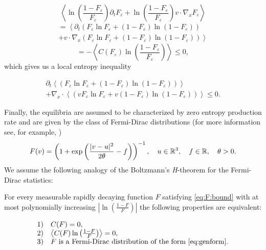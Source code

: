 \[ \left\langle\ln\left(\frac{1-F_\varepsilon }{F_\varepsilon}\right)\partial_t F_\varepsilon  +\ln\left(\frac{1-F_\varepsilon }{F_\varepsilon}\right)v\cdot \nabla_xF_\varepsilon\right\rangle   
\]
  \begin{multline*}=
	\left\langle\partial_t (F_\varepsilon \ln F_\varepsilon+(1-F_\varepsilon )\ln(1-F_\varepsilon ))  \right.\\+ \left.v\cdot \nabla_x(F_\varepsilon \ln F_\varepsilon+(1-F_\varepsilon )\ln(1-F_\varepsilon ))\right\rangle
\end{multline*}     
\[=-\left\langle
C(F_\varepsilon )\ln\left(\frac{1-F_\varepsilon }{F_\varepsilon}\right)\right\rangle \le0,\]which gives us a local entropy inequality

 \begin{multline*}
	\partial_t \left\langle(F_\varepsilon \ln F_\varepsilon+(1-F_\varepsilon )\ln(1-F_\varepsilon )) \right\rangle \\+ \nabla_x\cdot\left\langle(v F_\varepsilon \ln F_\varepsilon+v (1-F_\varepsilon )\ln(1-F_\varepsilon ))\right\rangle\le 0.
\end{multline*} 



Finally, the equilibria are assumed to be characterized by zero entropy
production rate and are given by the class of Fermi-Dirac distributions (for more information see, for example, \cite{Landau1968Course})
\begin{equation}\label{eq:genform}
F(v) =\left(1+ \exp\left(\frac{|v-u|^2}{2\theta}-f\right)\right)^{-1},\quad u\in {\mathbb {R}^3},\quad f\in\mathbb R,\quad \theta>0.
\end{equation}
We assume the following analogy of the Boltzmann's \textit{H}-theorem for the Fermi-Dirac statistics:
\begin{theorem}
	For every measurable rapidly decaying function $F$ satisfying \eqref{eq:F:bound} with at most polynomially increasing $|\ln \left(\frac{1-F}{F}\right)|$  the following properties 
are equivalent:
 
\begin{equation}\label{eq:Hthm:gen}\begin{array}{rl}
1)& C(F)=0,\\
2)&  \left\langle C(F)\ln \left(\frac{1-F}{F}\right)\right\rangle=0,\\
3)& F \mbox{ is a Fermi-Dirac distribution of the form }\eqref{eq:genform}.
\end{array}\end{equation}

\end{theorem}
